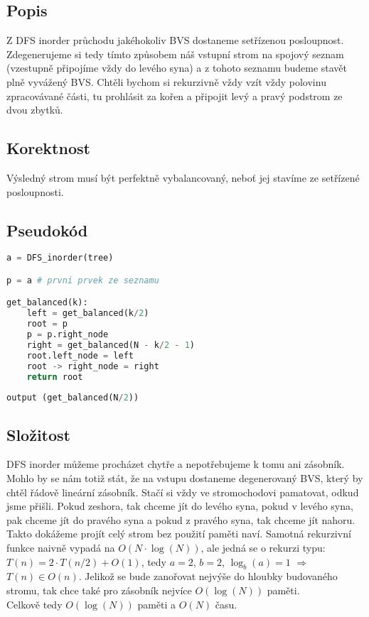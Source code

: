 \documentclass[a4paper]{article}
\begin{document}
\subsection{Popis}
Z DFS inorder průchodu jakéhokoliv BVS dostaneme setřízenou posloupnost. Zdegenerujeme si tedy tímto způsobem náš vstupní strom na spojový seznam (vzestupně připojíme vždy do levého syna) a z tohoto seznamu budeme stavět plně vyvážený BVS. Chtěli bychom si rekurzivně vždy vzít vždy polovinu zpracovávané části, tu prohlásit za kořen a připojit levý a pravý podstrom ze dvou zbytků.

\subsection{Korektnost}
Výsledný strom musí být perfektně vybalancovaný, neboť jej stavíme ze setřízené posloupnosti.
\pagebreak
\subsection{Pseudokód}
\begin{lstlisting}[language=Python]
a = DFS_inorder(tree)

p = a # prvni prvek ze seznamu

get_balanced(k):
	left = get_balanced(k/2)
	root = p
	p = p.right_node
	right = get_balanced(N - k/2 - 1)
	root.left_node = left
	root -> right_node = right
	return root
	
output (get_balanced(N/2))
\end{lstlisting}

\subsection{Složitost}
DFS inorder můžeme procházet chytře a nepotřebujeme k tomu ani zásobník. Mohlo by se nám totiž stát, že na vstupu dostaneme degenerovaný BVS, který by chtěl řádově lineární zásobník. Stačí si vždy ve stromochodovi pamatovat, odkud jsme přišli. Pokud zeshora, tak chceme jít do levého syna, pokud v levého syna, pak chceme jít do pravého syna a pokud z pravého syna, tak chceme jít nahoru. Takto dokážeme projít celý strom bez použití paměti naví. Samotná rekurzivní funkce naivně vypadá na $O(N\cdot \log (N))$, ale jedná se o rekurzi typu: $T(n) = 2\cdot T(n/2)+O(1)$, tedy $a=2$, $b=2$, $\log_b(a) = 1$ $\Rightarrow$ $T(n) \in O(n)$. Jelikož se bude zanořovat nejvýše do hloubky budovaného stromu, tak chce také pro zásobník nejvíce $O(\log(N))$ paměti.\\
 Celkově tedy $O(\log(N))$ paměti a $O(N)$ času.
\end{document}
